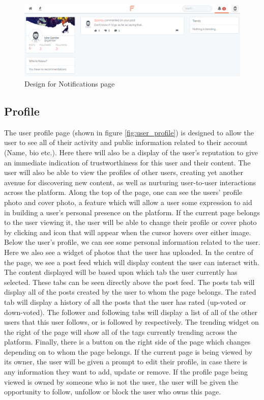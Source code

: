 \begin{figure}[H]
\centering
\includegraphics[width=1\linewidth]{Images/Design/notifications-page}
\caption{Design for Notifications page}
\label{fig:notifications-page}
\end{figure}

\subsection{Profile}
The user profile page (shown in figure \ref{fig:user_profile}) is designed to allow the user to see all of their activity and public information related to their account (Name, bio etc.). Here there will also be a display of the user's reputation to give an immediate indication of trustworthiness for this user and their content. The user will also be able to view the profiles of other users, creating yet another avenue for discovering new content, as well as nurturing user-to-user interactions across the platform. Along the top of the page, one can see the users' profile photo and cover photo, a feature which will allow a user some expression to aid in building a user's personal presence on the platform. If the current page belongs to the user viewing it, the user will be able to change their profile or cover photo by clicking and icon that will appear when the cursor hovers over either image. Below the user's profile, we can see some personal information related to the user. Here we also see a widget of photos that the user has uploaded. In the centre of the page, we see a post feed which will display content the user can interact with. The content displayed will be based upon which tab the user currently has selected. These tabs can be seen directly above the post feed. The posts tab will display all of the posts created by the user to whom the page belongs. The rated tab will display a history of all the posts that the user has rated (up-voted or down-voted). The follower and following tabs will display a list of all of the other users that this user follows, or is followed by respectively. The trending widget on the right of the page will show all of the tags currently trending across the platform. Finally, there is a button on the right side of the page which changes depending on to whom the page belongs. If the current page is being viewed by its owner, the user will be given a prompt to edit their profile, in case there is any information they want to add, update or remove. If the profile page being viewed is owned by someone who is not the user, the user will be given the opportunity to follow, unfollow or block the user who owns this page.

